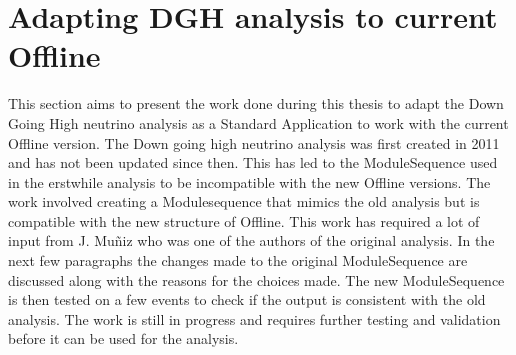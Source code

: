 \chapter{Adapting DGH analysis to current Offline}
\label{sec:app_5}
This section aims to present the work done during this thesis to adapt the Down Going High neutrino analysis as a Standard Application to work with the current Offline version. The Down going high neutrino analysis was first created in 2011 and has not been updated since then. This has led to the ModuleSequence used in the erstwhile analysis to be incompatible with the new Offline versions. The work involved creating a Modulesequence that mimics the old analysis but is compatible with the new structure of Offline. This work has required a lot of input from J. Muñiz  who was one of the authors of the original analysis. In the next few paragraphs the changes made to the original ModuleSequence are discussed along with the reasons for the choices made. The new ModuleSequence is then tested on a few events to check if the output is consistent with the old analysis. The work is still in progress and requires further testing and validation before it can be used for the analysis. 

